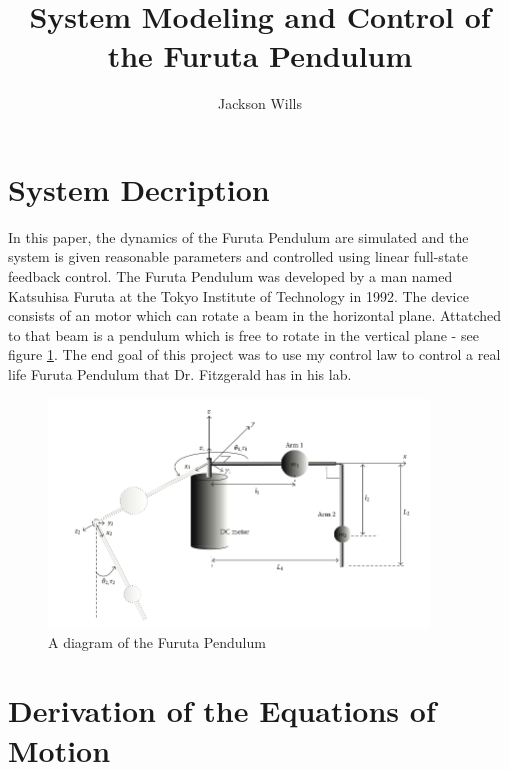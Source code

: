 \documentclass[letterpaper,10pt,oneside]{article}
\title{System Modeling and Control of the Furuta Pendulum}
\author{Jackson Wills}
\begin{document}
\maketitle

\tableofcontents

\newpage

\section{System Decription}

In this paper, the dynamics of the Furuta Pendulum are simulated and the system is given reasonable parameters and controlled using linear full-state feedback control. The Furuta Pendulum was developed by a man named Katsuhisa Furuta at the Tokyo Institute of Technology in 1992. The device consists of an motor which can rotate a beam in the horizontal plane. Attatched to that beam is a pendulum which is free to rotate in the vertical plane - see figure \ref{fig:diagram}. The end goal of this project was to use my control law to control a real life Furuta Pendulum that Dr. Fitzgerald has in his lab.


\begin{figure}[!ht]
  \centering
  \includegraphics[width=0.9\textwidth]{FurutaDiagram}
  \caption{A diagram of the Furuta Pendulum \citep{DYNAMICS}}
  \label{fig:diagram}
\end{figure}

\section{Derivation of the Equations of Motion}
\end{document}

